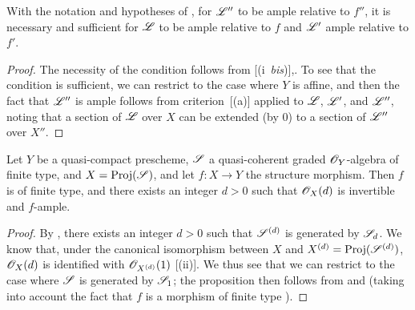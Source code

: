 \begin{proposition}[4.6.17]
\label{II.4.6.17}
With the notation and hypotheses of , for $\mathscr{L}''$ to be ample relative to $f''$, it is necessary and sufficient for $\mathscr{L}$ to be ample relative to $f$ and $\mathscr{L}'$ ample relative to $f'$.
\end{proposition}

\begin{proof}
The necessity of the condition follows from [(i~\emph{bis})],.
To see that the condition is sufficient, we can restrict to the case where $Y$ is affine, and then the fact that $\mathscr{L}''$ is ample follows from criterion~[(a)] applied to $\mathscr{L}$, $\mathscr{L}'$, and $\mathscr{L}''$, noting that a section of $\mathscr{L}$ over $X$ can be extended (by $0$) to a section of $\mathscr{L}''$ over $X''$.
\end{proof}

\begin{proposition}[4.6.18]
\label{II.4.6.18}
Let $Y$ be a quasi-compact prescheme, $\mathscr{S}$ a quasi-coherent graded $\mathscr{O}_Y$-algebra of finite type, and $X=\operatorname{Proj}(\mathscr{S})$, and let $f:X\to Y$ the structure morphism.
Then $f$ is of finite type, and there exists an integer $d>0$ such that $\mathscr{O}_X(d)$ is invertible and $f$-ample.
\end{proposition}

\begin{proof}
By , there exists an integer $d>0$ such that $\mathscr{S}^{(d)}$ is generated by $\mathscr{S}_d$.
We know that, under the canonical isomorphism between $X$ and $X^{(d)}=\operatorname{Proj}(\mathscr{S}^{(d)})$, $\mathscr{O}_X(d)$ is identified with $\mathscr{O}_{X^{(d)}}(1)$ [(ii)].
We thus see that we can restrict to the case where $\mathscr{S}$ is generated by $\mathscr{S}_1$;
the proposition then follows from  and  (taking into account the fact that $f$ is a morphism of finite type ).
\end{proof}
